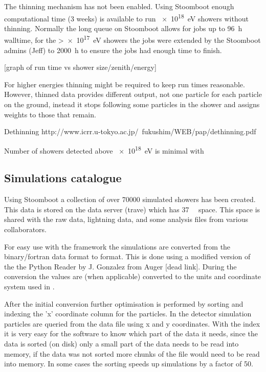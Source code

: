 The thinning mechanism has not been enabled. Using Stoomboot enough
computational time (3 weeks) is available to run
\SI{e18}{\electronvolt} showers without thinning. Normally the long
queue on Stoomboot allows for jobs up to \SI{96}{\hour} walltime, for the
>\SI{e17}{\electronvolt} showers the jobs were extended by the
Stoomboot admins (Jeff) to \SI{2000}{\hour} to ensure the jobs had
enough time to finish.

[graph of run time vs shower size/zenith/energy]

For higher energies thinning might be required to keep run times
reasonable. However, thinned data provides different output, not one
particle for each particle on the ground, instead it stops following
some particles in the shower and assigns weights to those that remain.

Dethinning http://www.icrr.u-tokyo.ac.jp/~fukushim/WEB/pap/dethinning.pdf

Number of showers detected above \SI{e18}{\electronvolt} is minimal with \hisparc


\subsection{Simulations catalogue}

Using Stoomboot a collection of over \num{70000} simulated showers has
been created. This data is stored on the \hisparc data server (trave)
which has \SI{37}{\tera\byte} space. This space is shared with the raw
\hisparc data, \knmi lightning data, and some analysis files from
various \hisparc collaborators.

For easy use with the \sapphire framework the \corsika simulations are
converted from the binary/fortran data format to \hdf format. This is
done using a modified version of the the Python \corsika Reader by J.
Gonzalez from Auger [dead link]. During the conversion the values are
(when applicable) converted to the units and coordinate system used in
.

After the initial conversion further optimisation is performed by
sorting and indexing the 'x' coordinate column for the particles. In the
detector simulation particles are queried from the \corsika data file
using x and y coordinates. With the index it is very easy for the
software to know which part of the data it needs, since the data is
sorted (on disk) only a small part of the data needs to be read into
memory, if the data was not sorted more chunks of the file would need to
be read into memory. In some cases the sorting speeds up simulations by
a factor of 50.

